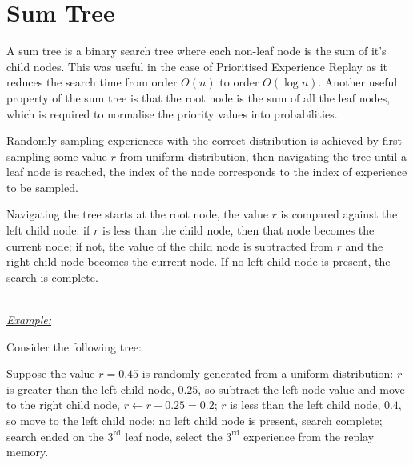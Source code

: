 \chapter{Sum Tree}\label{app:SumTree}

A sum tree is a binary search tree where each non-leaf node is the sum of it's
child nodes.
This was useful in the case of Prioritised Experience Replay as it reduces the
search time from order $O(n)$ to order $O(\log n)$.
Another useful property of the sum tree is that the root node is the sum of all
the leaf nodes, which is required to normalise the priority values into
probabilities.

Randomly sampling experiences with the correct distribution is achieved by first
sampling some value $r$ from uniform distribution, then navigating the tree
until a leaf node is reached, the index of the node corresponds to the index of
experience to be sampled.

Navigating the tree starts at the root node, the value $r$ is compared against
the left child node: if $r$ is less than the child node, then that node becomes
the current node; if not, the value of the child node is subtracted from $r$ and
the right child node becomes the current node.
If no left child node is present, the search is complete.

~\\
\underline{\textit{Example:}}

\noindent Consider the following tree:
\begin{center}
\end{center}
Suppose the value $r = 0.45$ is randomly generated from a uniform distribution:
$r$ is greater than the left child node, $0.25$, so subtract the left node value
and move to the right child node, $r \leftarrow r - 0.25 = 0.2$;
$r$ is less than the left child node, $0.4$, so move to the left child node;
no left child node is present, search complete;
search ended on the $3^\text{rd}$ leaf node, select the $3^\text{rd}$
experience from the replay memory.
